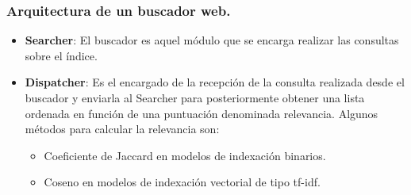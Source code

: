 \documentclass[9pt]{beamer} %
\begin{document}
\begin{frame}
	\frametitle{Arquitectura de un buscador web.}

	\begin{itemize}
		\item \textbf{Searcher}: El buscador es aquel módulo que se encarga realizar las consultas sobre el índice.
		\item \textbf{Dispatcher}: Es el encargado de la recepción de la consulta realizada desde el buscador y enviarla al Searcher para posteriormente obtener una lista ordenada en función de una puntuación denominada relevancia. Algunos métodos para calcular la relevancia son:
		\begin{itemize}
			\item Coeficiente de Jaccard en modelos de indexación binarios.
			\item Coseno en modelos de indexación vectorial de tipo tf-idf.
		\end{itemize}


	\end{itemize}
\end{frame}
\end{document}
